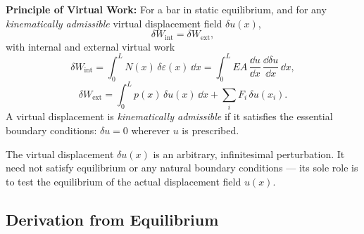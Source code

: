 \begin{importantbox}
\textbf{Principle of Virtual Work:}
For a bar in static equilibrium, and for any \emph{kinematically admissible}
virtual displacement field $\delta u(x)$,
\begin{equation}
    \delta W_{\mathrm{int}} = \delta W_{\mathrm{ext}} ,
    \label{eq:pvw_statement}
\end{equation}
with internal and external virtual work
\[
   \delta W_{\mathrm{int}}
     = \int_0^L N(x)\,\delta\varepsilon(x)\,\dd x
     = \int_0^L EA\,\frac{\dd u}{\dd x}\,\frac{\dd \delta u}{\dd x}\,\dd x ,
\]
\[
   \delta W_{\mathrm{ext}}
     = \int_0^L p(x)\,\delta u(x)\,\dd x
     + \sum_i F_i\,\delta u(x_i) .
\]
A virtual displacement is \emph{kinematically admissible} if it satisfies the
essential boundary conditions: $\delta u = 0$ wherever $u$ is prescribed.
\end{importantbox}

The virtual displacement $\delta u(x)$ is an arbitrary, infinitesimal
perturbation. It need not satisfy equilibrium or any natural boundary
conditions — its sole role is to test the equilibrium of the actual
displacement field $u(x)$.

\subsection{Derivation from Equilibrium}

